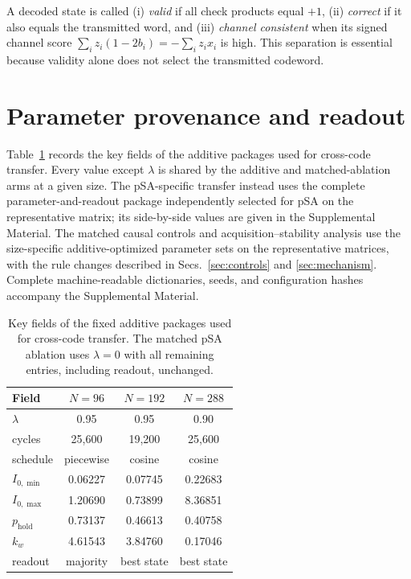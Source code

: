 \documentclass[aps,prapplied,reprint,superscriptaddress,longbibliography,floatfix]{revtex4-2}
\newcommand{\psa}{pSA}
\begin{document}
A decoded state is called (i) \emph{valid} if all check products equal $+1$, (ii) \emph{correct} if it also equals the transmitted word, and (iii) \emph{channel consistent} when its signed channel score $\sum_i z_i(1-2b_i)=-\sum_i z_i x_i$ is high.  This separation is essential because validity alone does not select the transmitted codeword.

\section{Parameter provenance and readout}
\label{app:parameters}

Table~\ref{tab:transferparams} records the key fields of the additive packages used for cross-code transfer.  Every value except $\lambda$ is shared by the additive and matched-ablation arms at a given size.  The pSA-specific transfer instead uses the complete parameter-and-readout package independently selected for \psa{} on the representative matrix; its side-by-side values are given in the Supplemental Material.  The matched causal controls and acquisition--stability analysis use the size-specific additive-optimized parameter sets on the representative matrices, with the rule changes described in Secs.~\ref{sec:controls} and \ref{sec:mechanism}.  Complete machine-readable dictionaries, seeds, and configuration hashes accompany the Supplemental Material.

\begin{table}[t]
\caption{Key fields of the fixed additive packages used for cross-code transfer.  The matched \psa{} ablation uses $\lambda=0$ with all remaining entries, including readout, unchanged.}
\label{tab:transferparams}
\begin{ruledtabular}
\begin{tabular}{lccc}
Field & $N=96$ & $N=192$ & $N=288$ \\
\hline
$\lambda$ & 0.95 & 0.95 & 0.90 \\
cycles & 25,600 & 19,200 & 25,600 \\
schedule & piecewise & cosine & cosine \\
$I_{0,\min}$ & 0.06227 & 0.07745 & 0.22683 \\
$I_{0,\max}$ & 1.20690 & 0.73899 & 8.36851 \\
$p_{\mathrm{hold}}$ & 0.73137 & 0.46613 & 0.40758 \\
$k_w$ & 4.61543 & 3.84760 & 0.17046 \\
readout & majority & best state & best state \\
\end{tabular}
\end{ruledtabular}
\end{table}
\end{document}
